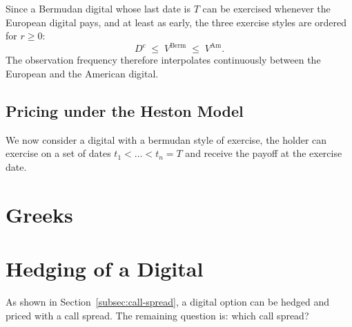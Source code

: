 \documentclass[11pt,a4paper]{article}
\theoremstyle{remark}
\begin{document}
Since a Bermudan digital whose last date is $T$ can be exercised whenever the
European digital pays, and at least as early, the three exercise styles are
ordered for $r \geq 0$:
\begin{equation}
  D^{c} \;\leq\; V^{\mathrm{Berm}} \;\leq\; V^{\mathrm{Am}}.
  \label{eq:ordering}
\end{equation}
The observation frequency therefore interpolates continuously between the
European and the American digital.

\subsection{Pricing under the Heston Model}
\label{subsec:heston-bermudan}

We now consider a digital with a bermudan style of exercise, the holder can exercise on a set of dates $t_1 < \dots < t_n = T$ and receive the payoff at the exercise date. 




\section{Greeks}
\label{sec:greeks}

\section{Hedging of a Digital}
\label{sec:hedging}

As shown in Section~\ref{subsec:call-spread}, a digital option can be hedged
and priced with a call spread. The remaining question is: which call spread?
\end{document}
